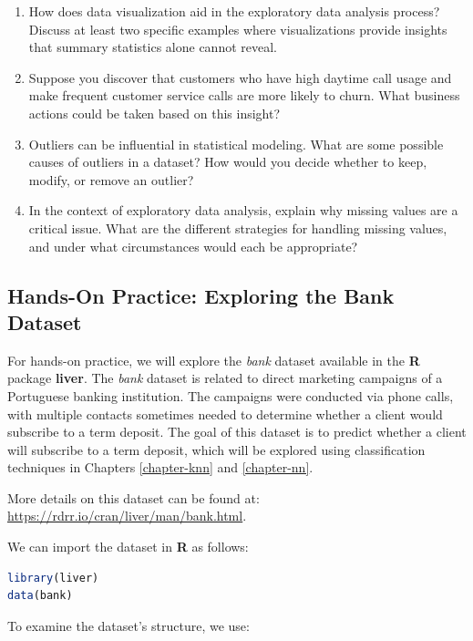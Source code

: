 \documentclass[
  11pt,
]{book}
\theoremstyle{definition}
\theoremstyle{definition}
\theoremstyle{definition}
\theoremstyle{definition}
\theoremstyle{remark}
\begin{document}
\begin{enumerate}
\item
  How does data visualization aid in the exploratory data analysis process? Discuss at least two specific examples where visualizations provide insights that summary statistics alone cannot reveal.
\item
  Suppose you discover that customers who have high daytime call usage and make frequent customer service calls are more likely to churn. What business actions could be taken based on this insight?
\item
  Outliers can be influential in statistical modeling. What are some possible causes of outliers in a dataset? How would you decide whether to keep, modify, or remove an outlier?
\item
  In the context of exploratory data analysis, explain why missing values are a critical issue. What are the different strategies for handling missing values, and under what circumstances would each be appropriate?
\end{enumerate}

\subsection*{Hands-On Practice: Exploring the Bank Dataset}\label{hands-on-practice-exploring-the-bank-dataset}


For hands-on practice, we will explore the \emph{bank} dataset available in the \textbf{R} package \textbf{liver}. The \emph{bank} dataset is related to direct marketing campaigns of a Portuguese banking institution. The campaigns were conducted via phone calls, with multiple contacts sometimes needed to determine whether a client would subscribe to a term deposit. The goal of this dataset is to predict whether a client will subscribe to a term deposit, which will be explored using classification techniques in Chapters \ref{chapter-knn} and \ref{chapter-nn}.

More details on this dataset can be found at: \url{https://rdrr.io/cran/liver/man/bank.html}.

We can import the dataset in \textbf{R} as follows:

\begin{lstlisting}[language=R]
library(liver)
data(bank)      
\end{lstlisting}

To examine the dataset's structure, we use:
\end{document}
